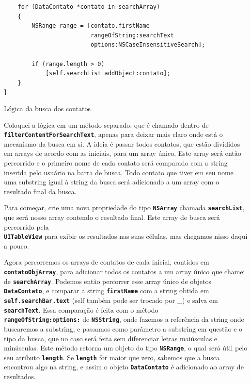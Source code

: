 \documentclass[a4paper,12pt,brazil,doubleside]{book}
\begin{document}
\begin{singlespace}
\begin{listing}[H]
\begin{verbatim}
    for (DataContato *contato in searchArray)
    {
        NSRange range = [contato.firstName
                         rangeOfString:searchText
                         options:NSCaseInsensitiveSearch];
        
        if (range.length > 0)
            [self.searchList addObject:contato];
    }
}
\end{verbatim}
\caption{Lógica da busca dos contatos}
\end{listing}


Coloquei a lógica em um método separado, que é chamado dentro de\\
\texttt{\textbf{filterContentForSearchText}}, apenas para deixar mais claro onde está o mecanismo da busca em si. A ideia é passar todos contatos, que estão divididos em arrays de acordo com as iniciais, para um array único. Este array será então percorrido e o primeiro nome de cada contato será comparado com a string inserida pelo usuário na barra de busca. Todo contato que tiver em seu nome uma substring igual à string da busca será adicionado a um array com o resultado final da busca.

Para começar, crie uma nova propriedade do tipo \texttt{\textbf{NSArray}} chamada \texttt{\textbf{searchList}}, que será nosso array contendo o resultado final. Este array de busca será percorrido pela\\
\texttt{\textbf{UITableView}} para exibir os resultados nas suas células, mas chegamos nisso daqui a pouco.

Agora percorremos os arrays de contatos de cada inicial, contidos em \texttt{\textbf{contatoObjArray}}, para adicionar todos os contatos a um array único que chamei de \texttt{\textbf{searchArray}}. Podemos então percorrer esse array único de objetos \texttt{\textbf{DataContato}}, e comparar a string \texttt{\textbf{firstName}} com a string obtida em \texttt{\textbf{self.searchBar.text}} (self também pode ser trocado por \_) e salva em \texttt{\textbf{searchText}}. Essa comparação é feita com o método\\
\texttt{\textbf{rangeOfString:options:}} de \texttt{\textbf{NSString}}, onde fazemos a referência da string onde buscaremos a substring, e passamos como parâmetro a substring em questão e o tipo da busca, que no caso será feita sem diferenciar letras maiúsculas e minúsculas. Este método retorna um objeto do tipo \texttt{\textbf{NSRange}}, o qual será útil pelo seu atributo \texttt{\textbf{length}}. Se \texttt{\textbf{length}} for maior que zero, sabemos que a busca encontrou algo na string, e assim o objeto \texttt{\textbf{DataContato}} é adicionado ao array de resultados.


\end{singlespace}
\end{document}

